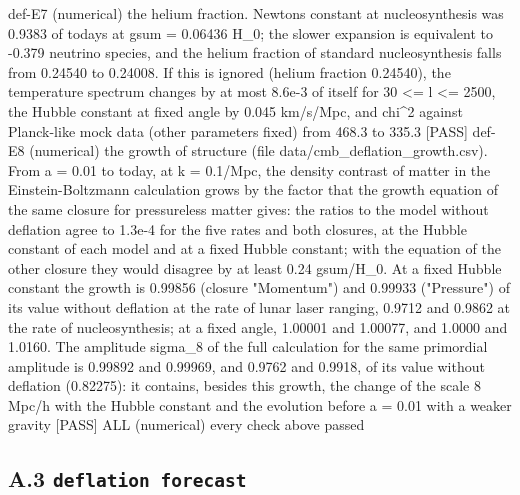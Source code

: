 \documentclass[
  10pt,
]{article}
\newenvironment{Shaded}{}{}
\newcommand{\NormalTok}[1]{#1}
\begin{document}
\begin{Shaded}
\begin{Highlighting}[]
\NormalTok{[PASS] def{-}E7  (numerical) the helium fraction. Newton\textquotesingle{}s constant at nucleosynthesis was 0.9383 of today\textquotesingle{}s at gsum = 0.06436 H\_0; the slower expansion is equivalent to {-}0.379 neutrino species, and the helium fraction of standard nucleosynthesis falls from 0.24540 to 0.24008. If this is ignored (helium fraction 0.24540), the temperature spectrum changes by at most 8.6e{-}3 of itself for 30 \textless{}= l \textless{}= 2500, the Hubble constant at fixed angle by 0.045 km/s/Mpc, and chi\^{}2 against Planck{-}like mock data (other parameters fixed) from 468.3 to 335.3}
\NormalTok{[PASS] def{-}E8  (numerical) the growth of structure (file data/cmb\_deflation\_growth.csv). From a = 0.01 to today, at k = 0.1/Mpc, the density contrast of matter in the Einstein{-}Boltzmann calculation grows by the factor that the growth equation of the same closure for pressureless matter gives: the ratios to the model without deflation agree to 1.3e{-}4 for the five rates and both closures, at the Hubble constant of each model and at a fixed Hubble constant; with the equation of the other closure they would disagree by at least 0.24 gsum/H\_0. At a fixed Hubble constant the growth is 0.99856 (closure "Momentum") and 0.99933 ("Pressure") of its value without deflation at the rate of lunar laser ranging, 0.9712 and 0.9862 at the rate of nucleosynthesis; at a fixed angle, 1.00001 and 1.00077, and 1.0000 and 1.0160. The amplitude sigma\_8 of the full calculation for the same primordial amplitude is 0.99892 and 0.99969, and 0.9762 and 0.9918, of its value without deflation (0.82275): it contains, besides this growth, the change of the scale 8 Mpc/h with the Hubble constant and the evolution before a = 0.01 with a weaker gravity}
\NormalTok{[PASS] ALL  (numerical) every check above passed}
\end{Highlighting}
\end{Shaded}

\hypertarget{a.3-deflation-forecast}{%
\subsection{\texorpdfstring{A.3
\texttt{deflation\ forecast}}{A.3 deflation forecast}}\label{a.3-deflation-forecast}}
\end{document}
